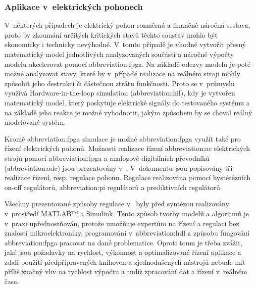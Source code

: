 \documentclass[a4paper, twoside, 11pt]{article}
\begin{document}
			\subsubsection{Aplikace v~elektrických pohonech}
			V~některých případech je elektrický pohon rozměrná a finančně náročná sestava, proto by zkoumání určitých kritických stavů těchto soustav mohlo být ekonomicky i technicky nevýhodné. V~tomto případě je vhodné vytvořit přesný matematický model jednotlivých analyzovaných součástí a náročné výpočty modelu akcelerovat pomocí \gls{abbreviation:fpga}. Na základě odezvy modelu je poté možné analyzovat stavy, které by v~případě realizace na reálném stroji mohly způsobit jeho destrukci či částečnou ztrátu funkčnosti. Proto se v~průmyslu využívá Hardware-in-the-loop simulation (\gls{abbreviation:hil}), kdy je vytvořen matematický model, který poskytuje elektrické signály do testovaného systému a na základě jeho reakce je možné vyhodnotit, jakým způsobem by se choval reálný modelovaný systém. \cite{andina-advanced-features-and-industrial-applications-of-fpga} \cite{mathworks-discovery-hil-simulation}\par
			Kromě \gls{abbreviation:fpga} simulace je možné \gls{abbreviation:fpga} využít také pro řízení elektrických pohonů. Možnosti realizace řízení \gls{abbreviation:ac} elektrických strojů pomocí \gls{abbreviation:fpga} a analogově digitálních převodníků (\gls{abbreviation:adc}) jsou prezentovány v~\cite{naouar-fpga-based-current-controllers-for-ac-machine-drives}. V~dokumentu jsou popisovány tři realizace řízení, resp. regulace pohonu. Regulace realizována pomocí hystérézních on-off regulátorů, \gls{abbreviation:pi} regulátorů a prediktivních regulátorů. \cite{naouar-fpga-based-current-controllers-for-ac-machine-drives}\par
			Všechny prezentované způsoby regulace v~\cite{naouar-fpga-based-current-controllers-for-ac-machine-drives} byly před syntézou realizovány v~prostředí MATLAB™️ a Simulink. Tento způsob tvorby modelů a algoritmů je v~praxi upřednostňován, protože umožňuje  expertům na řízení a regulaci bez znalostí mikroelektroniky, programování v~\gls{abbreviation:hdl} a způsobu fungování \gls{abbreviation:fpga} pracovat na dané problematice. Oproti tomu je třeba zvážit, jaké jsou požadavky na rychlost, výkonnost a optimalizované řízení aplikace a zdali použití předpřipravených knihoven a zjednodušených nástrojů nebude mít příliš značný vliv na rychlost výpočtu a tudíž zpracování dat a řízení v~reálném čase.~\cite{naouar-fpga-based-current-controllers-for-ac-machine-drives}
			
\end{document}
